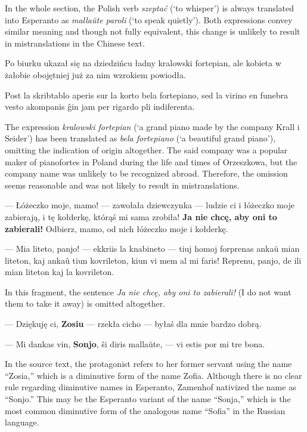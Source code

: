 In the whole section, the Polish verb \textit{szeptać} (`to whisper') is always translated into Esperanto as \textit{mallaŭte paroli} (`to speak quietly').
Both expressions convey similar meaning and though not fully equivalent, this change is unlikely to result in mistranslations in the Chinese text.

Po biurku ukazał się na dziedzińcu ładny kralowski fortepian, ale kobieta w żałobie obojętniej już za nim wzrokiem powiodła.

Post la skribtablo aperis sur la korto bela fortepiano, sed la virino en funebra vesto akompanis ĝin jam per rigardo pli indiferenta.

The expression \textit{kralowski fortepian} (`a grand piano made by the company Krall i Seider') has been translated as \textit{bela fortepiano} (`a beautiful grand piano'), omitting the indication of origin altogether.
The said company was a popular maker of pianofortes in Poland during the life and times of Orzeszkowa, but the company name was unlikely to be recognized abroad.
Therefore, the omission seems reasonable and was not likely to result in mistranslations.

--- Łóżeczko moje, mamo! --- zawołała dziewczynka --- ludzie ci i łóżeczko moje zabierają, i tę kołderkę, którąś mi sama zrobiła! \textbf{Ja nie chcę, aby oni to zabierali!} Odbierz, mamo, od nich łóżeczko moje i kołderkę.

--- Mia liteto, panjo! --- ekkriis la knabineto --- tiuj homoj forprenas ankaŭ mian liteton, kaj ankaû tiun kovrileton, kiun vi mem al mi faris! Reprenu, panjo, de ili mian liteton kaj la kovrileton.

In this fragment, the sentence \textit{Ja nie chcę, aby oni to zabierali!} (I do not want them to take it away) is omitted altogether.

--- Dziękuję ci, \textbf{Zosiu} --- rzekła cicho --- byłaś dla mnie bardzo dobrą.

--- Mi dankas vin, \textbf{Sonjo}, ŝi diris mallaŭte, --- vi estis por mi tre bona.

In the source text, the protagonist refers to her former servant using the name ``Zosia,'' which is a diminutive form of the name Zofia.
Although there is no clear rule regarding diminutive names in Esperanto, Zamenhof nativized the name as ``Sonjo.''
This may be the Esperanto variant of the name ``Sonja,'' which is the most common diminutive form of the analogous name ``Sofia'' in the Russian language.
